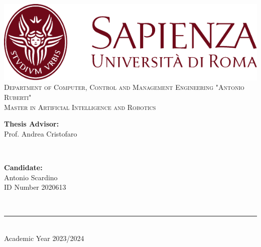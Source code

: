 \begin{titlepage}
    \centering
       \vspace*{0.5 cm}
       \includegraphics[scale = 0.75]{SapienzaLogo.pdf}\\[1.0 cm] %
   
       \vspace*{-0.4cm}
       \textsc{\large Department of Computer, Control and Management Engineering "Antonio Ruberti" \\
       Master in Artificial Intelligence and Robotics}\\[2.0 cm] %
       \vspace*{1cm}
   
       { \fontsize{20.74pt}{18.5pt}\selectfont\bfseries \thetitle \par } %
       \vspace*{2.6cm}
    \begin{minipage}{0.4\textwidth} %
     \begin{flushleft} \large
      \textbf{Thesis Advisor:}\\
      Prof. Andrea Cristofaro\\
     \end{flushleft}
    \end{minipage}~
    \begin{minipage}{0.3\textwidth} %
     \begin{flushright} \large
     \begin{minipage}{1\textwidth}
     \begin{flushleft} \large
      \textbf{Candidate:} \\
      Antonio Scardino\\ ID Number 2020613
           \end{flushleft}
           \end{minipage}
     \end{flushright}
    \end{minipage}\\[3.85 cm]
   
       \vspace{2cm}
       \rule{\linewidth}{0.2 mm} \\[0.3 cm]
       \vspace*{-0.2cm}
       Academic Year 2023/2024
\end{titlepage}